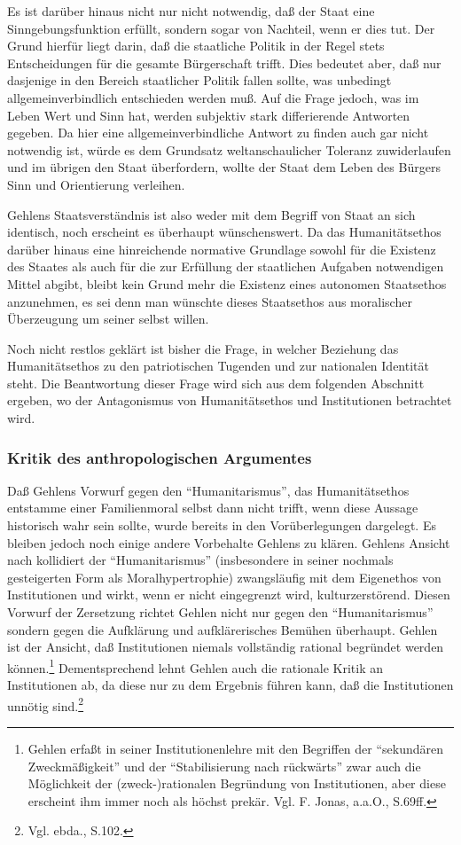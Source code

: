 \documentclass[12pt,a4paper]{article}
\begin{document}
Es ist darüber hinaus nicht nur nicht notwendig, daß der Staat eine
Sinngebungsfunktion erfüllt, sondern sogar von Nachteil, wenn er dies tut.
Der Grund hierfür liegt darin, daß die staatliche Politik in der Regel
stets Entscheidungen für die gesamte Bürgerschaft trifft. Dies bedeutet
aber, daß nur dasjenige in den Bereich staatlicher Politik fallen sollte,
was unbedingt allgemeinverbindlich entschieden werden muß. Auf die Frage
jedoch, was im Leben Wert und Sinn hat, werden subjektiv stark differierende
Antworten gegeben. Da hier eine allgemeinverbindliche Antwort zu finden
auch gar nicht notwendig ist, würde es dem Grundsatz weltanschaulicher
Toleranz zuwiderlaufen und im übrigen den Staat überfordern, wollte der
Staat dem Leben des Bürgers Sinn und Orientierung verleihen.

Gehlens Staatsverständnis ist also weder mit dem Begriff von Staat an sich
identisch, noch erscheint es überhaupt wünschenswert. Da das
Humanitätsethos darüber hinaus eine hinreichende normative Grundlage sowohl
für die Existenz des Staates als auch für die zur Erfüllung der
staatlichen Aufgaben notwendigen Mittel abgibt, bleibt kein Grund mehr die
Existenz eines autonomen Staatsethos anzunehmen, es sei denn man wünschte
dieses Staatsethos aus moralischer Überzeugung um seiner selbst willen.

Noch nicht restlos geklärt ist bisher die Frage, in welcher Beziehung
das Humanitätsethos zu den patriotischen Tugenden und zur nationalen
Identität steht. Die Beantwortung dieser Frage wird sich aus dem folgenden
Abschnitt ergeben, wo der Antagonismus von Humanitätsethos und Institutionen
betrachtet wird.

\subsubsection{Kritik des anthropologischen Argumentes}

Daß Gehlens Vorwurf gegen den "`Humanitarismus"', das Humanitätsethos
entstamme einer Familienmoral selbst dann nicht trifft, wenn diese Aussage
historisch wahr sein sollte, wurde bereits in den Vorüberlegungen dargelegt.
Es bleiben jedoch noch einige andere Vorbehalte Gehlens zu klären. Gehlens
Ansicht nach kollidiert der "`Humanitarismus"' (insbesondere in seiner
nochmals gesteigerten Form als Moralhypertrophie) zwangsläufig mit dem
Eigenethos von Institutionen und wirkt, wenn er nicht eingegrenzt wird,
kulturzerstörend. Diesen Vorwurf der Zersetzung richtet Gehlen nicht nur gegen
den "`Humanitarismus"' sondern gegen die Aufklärung und aufklärerisches
Bemühen überhaupt. Gehlen ist der Ansicht, daß Institutionen niemals
vollständig rational begründet werden können.\footnote{Gehlen erfaßt in seiner
  Institutionenlehre mit den Begriffen der "`sekundären Zweckmäßigkeit"' und
  der "`Stabilisierung nach rückwärts"' zwar auch die Möglichkeit der
  (zweck-)rationalen Begründung von Institutionen, aber diese erscheint ihm
  immer noch als höchst prekär. Vgl. F. Jonas, a.a.O., S.69ff.}
Dementsprechend lehnt Gehlen auch die rationale Kritik an Institutionen ab, da
diese nur zu dem Ergebnis führen kann, daß die Institutionen unnötig
sind.\footnote{Vgl. ebda., S.102.}
\end{document}
